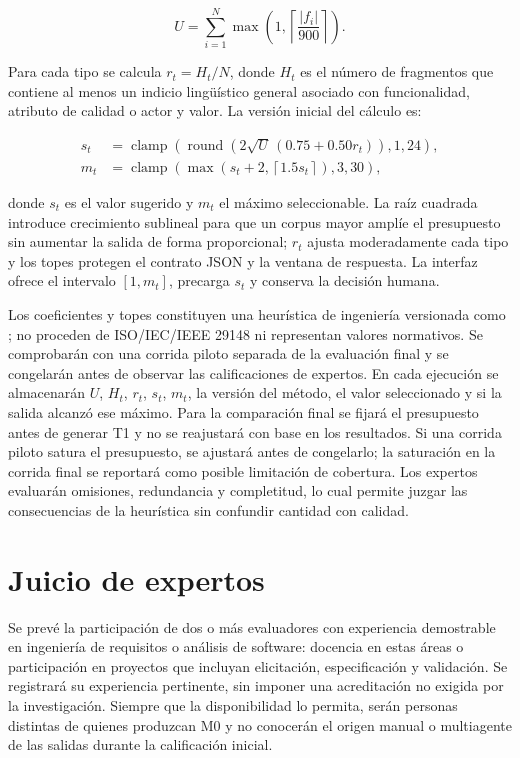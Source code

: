 \begin{equation}
  U=\sum_{i=1}^{N}\max\left(1,\left\lceil\frac{\lvert f_i\rvert}{900}\right\rceil\right).
\end{equation}

Para cada tipo se calcula \(r_t=H_t/N\), donde \(H_t\) es el número de fragmentos que contiene al menos un indicio lingüístico general asociado con funcionalidad, atributo de calidad o actor y valor. La versión inicial del cálculo es:

\begin{align}
  s_t &= \operatorname{clamp}\!\left(
    \operatorname{round}\!\left(2\sqrt{U}\,(0.75+0.50r_t)\right),1,24
  \right), \\
  m_t &= \operatorname{clamp}\!\left(
    \max\!\left(s_t+2,\left\lceil1.5s_t\right\rceil\right),3,30
  \right),
\end{align}

donde \(s_t\) es el valor sugerido y \(m_t\) el máximo seleccionable. La raíz cuadrada introduce crecimiento sublineal para que un corpus mayor amplíe el presupuesto sin aumentar la salida de forma proporcional; \(r_t\) ajusta moderadamente cada tipo y los topes protegen el contrato JSON y la ventana de respuesta. La interfaz ofrece el intervalo \([1,m_t]\), precarga \(s_t\) y conserva la decisión humana.

Los coeficientes y topes constituyen una heurística de ingeniería versionada como ; no proceden de ISO/IEC/IEEE 29148 ni representan valores normativos. Se comprobarán con una corrida piloto separada de la evaluación final y se congelarán antes de observar las calificaciones de expertos. En cada ejecución se almacenarán \(U\), \(H_t\), \(r_t\), \(s_t\), \(m_t\), la versión del método, el valor seleccionado y si la salida alcanzó ese máximo. Para la comparación final se fijará el presupuesto antes de generar T1 y no se reajustará con base en los resultados. Si una corrida piloto satura el presupuesto, se ajustará antes de congelarlo; la saturación en la corrida final se reportará como posible limitación de cobertura. Los expertos evaluarán omisiones, redundancia y completitud, lo cual permite juzgar las consecuencias de la heurística sin confundir cantidad con calidad.

\section{Juicio de expertos}

Se prevé la participación de dos o más evaluadores con experiencia demostrable en ingeniería de requisitos o análisis de software: docencia en estas áreas o participación en proyectos que incluyan elicitación, especificación y validación. Se registrará su experiencia pertinente, sin imponer una acreditación no exigida por la investigación. Siempre que la disponibilidad lo permita, serán personas distintas de quienes produzcan M0 y no conocerán el origen manual o multiagente de las salidas durante la calificación inicial.


